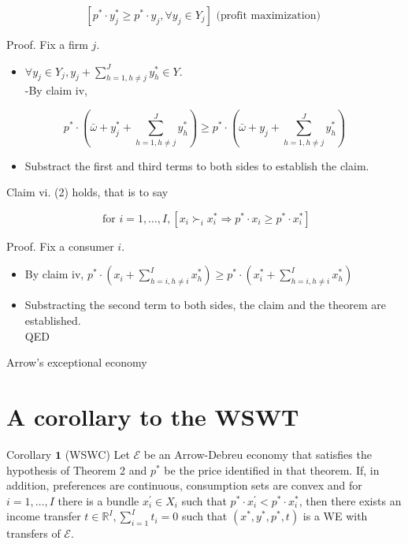 \documentclass[10pt]{article}
\begin{document}
$$
\left[p^{*} \cdot y_{j}^{*} \geq p^{*} \cdot y_{j}, \forall y_{j} \in Y_{j}\right] \text { (profit maximization) }
$$

Proof. Fix a firm $j$.

\begin{itemize}
  \item $\forall y_{j} \in Y_{j}, y_{j}+\sum_{h=1, h \neq j}^{J} y_{h}^{*} \in Y$.\\
-By claim iv,
\end{itemize}

$$
p^{*} \cdot\left(\bar{\omega}+y_{j}^{*}+\sum_{h=1, h \neq j}^{J} y_{h}^{*}\right) \geq p^{*} \cdot\left(\bar{\omega}+y_{j}+\sum_{h=1, h \neq j}^{J} y_{h}^{*}\right)
$$

\begin{itemize}
  \item Substract the first and third terms to both sides to establish the claim.
\end{itemize}

Claim vi. (2) holds, that is to say

$$
\text { for } i=1, \ldots, I,\left[x_{i} \succ_{i} x_{i}^{*} \Longrightarrow p^{*} \cdot x_{i} \geq p^{*} \cdot x_{i}^{*}\right]
$$

Proof. Fix a consumer $i$.

\begin{itemize}
  \item By claim iv, $p^{*} \cdot\left(x_{i}+\sum_{h=i, h \neq i}^{I} x_{h}^{*}\right) \geq p^{*} \cdot\left(x_{i}^{*}+\sum_{h=i, h \neq i}^{I} x_{h}^{*}\right)$
  \item Substracting the second term to both sides, the claim and the theorem are established.\\
QED
\end{itemize}

Arrow's exceptional economy

\section*{A corollary to the WSWT}
Corollary $\mathbf{1}$ (WSWC) Let $\mathcal{E}$ be an Arrow-Debreu economy that satisfies the hypothesis of Theorem 2 and $p^{*}$ be the price identified in that theorem. If, in addition, preferences are continuous, consumption sets are convex and for $i=1, \ldots, I$ there is a bundle $x_{i}^{\prime} \in X_{i}$ such that $p^{*} \cdot x_{i}^{\prime}<p^{*} \cdot x_{i}^{*}$, then there exists an income transfer $t \in \mathbb{R}^{I}, \sum_{i=1}^{I} t_{i}=0$ such that $\left(x^{*}, y^{*}, p^{*}, t\right)$ is a WE with transfers of $\mathcal{E}$.
\end{document}

